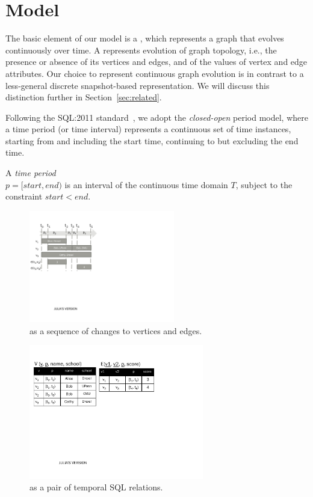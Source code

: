 \section{Model}
\label{sec:model}

The basic element of our model is a \tg, which represents a graph that
evolves continuously over time.  A \tg represents evolution of graph
topology, i.e., the presence or absence of its vertices and edges, and
of the values of vertex and edge attributes.  Our choice to represent
continuous graph evolution is in contrast to a less-general discrete
snapshot-based representation.  We will discuss this distinction
further in Section~\ref{sec:related}.

Following the SQL:2011
standard~\cite{DBLP:journals/sigmod/KulkarniM12}, we adopt the {\em
  closed-open} period model, where a time period (or time interval)
represents a continuous set of time instances, starting from and
including the start time, continuing to but excluding the end time.

\begin{definition}
A {\em time period} \\$p = [start, end)$ is an interval of the
  continuous time domain $T$, subject to the constraint $start < end$.
\label{def:period} 
\end{definition}

\begin{figure}
\centering
\includegraphics[width=2.5in]{figs/T1_relations.pdf}
\caption{\tg {} as a sequence of changes to vertices and edges.}
\label{fig:tg_ve}
\end{figure}

\begin{figure}
\centering
\includegraphics[width=3in]{figs/T1_tables.pdf}
\caption{\tg {} as a pair of temporal SQL relations.}
\label{fig:tg_tab}
\end{figure}

